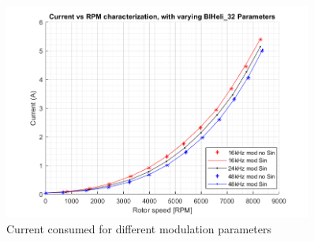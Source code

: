 \begin{figure}
  \centering
  \includegraphics[width=0.9\textwidth]{images/efficiency_characterization.png}
  \caption{Current consumed for different modulation parameters}
  \label{fig:efficiency_characterization}
\end{figure}
